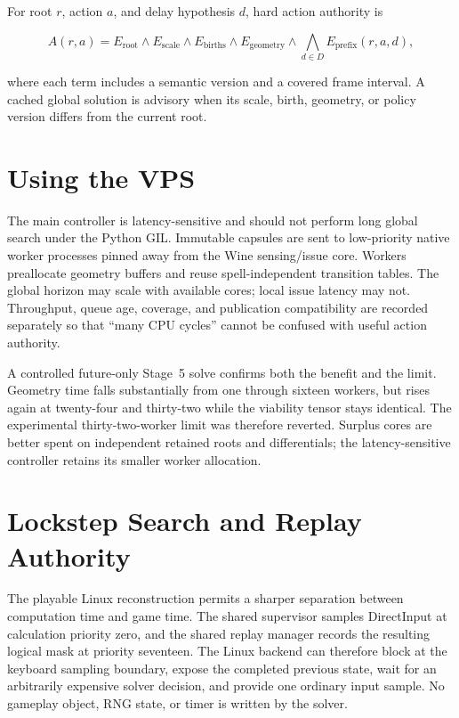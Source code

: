 \documentclass[10pt]{article}
\begin{document}
For root $r$, action $a$, and delay hypothesis $d$, hard action authority is

\[
  A(r,a) = E_{\mathrm{root}} \land E_{\mathrm{scale}}
  \land E_{\mathrm{births}} \land E_{\mathrm{geometry}}
  \land \bigwedge_{d\in D} E_{\mathrm{prefix}}(r,a,d),
\]

where each term includes a semantic version and a covered frame interval.  A
cached global solution is advisory when its scale, birth, geometry, or policy
version differs from the current root.

\section{Using the VPS}

The main controller is latency-sensitive and should not perform long global
search under the Python GIL.  Immutable capsules are sent to low-priority
native worker processes pinned away from the Wine sensing/issue core.  Workers
preallocate geometry buffers and reuse spell-independent transition tables.
The global horizon may scale with available cores; local issue latency may not.
Throughput, queue age, coverage, and publication compatibility are recorded
separately so that ``many CPU cycles'' cannot be confused with useful action
authority.

A controlled future-only Stage~5 solve confirms both the benefit and the
limit.  Geometry time falls substantially from one through sixteen workers,
but rises again at twenty-four and thirty-two while the viability tensor stays
identical.  The experimental thirty-two-worker limit was therefore reverted.
Surplus cores are better spent on independent retained roots and differentials;
the latency-sensitive controller retains its smaller worker allocation.

\section{Lockstep Search and Replay Authority}

The playable Linux reconstruction permits a sharper separation between
computation time and game time.  The shared supervisor samples DirectInput at
calculation priority zero, and the shared replay manager records the resulting
logical mask at priority seventeen.  The Linux backend can therefore block at
the keyboard sampling boundary, expose the completed previous state, wait for
an arbitrarily expensive solver decision, and provide one ordinary input
sample.  No gameplay object, RNG state, or timer is written by the solver.
\end{document}
